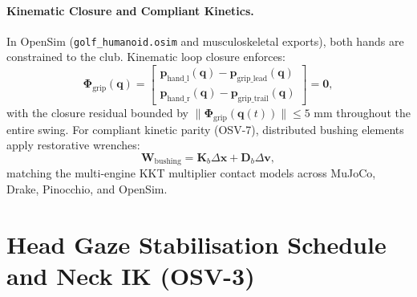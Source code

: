\documentclass[11pt]{article}
\begin{document}
\paragraph{Kinematic Closure and Compliant Kinetics.}
In OpenSim (\texttt{golf\_humanoid.osim} and musculoskeletal exports), both hands are constrained to the club. Kinematic loop closure enforces:
\begin{equation}
  \mathbf{\Phi}_{\mathrm{grip}}(\mathbf{q}) = 
  \begin{bmatrix}
    \mathbf{p}_{\mathrm{hand\_l}}(\mathbf{q}) - \mathbf{p}_{\mathrm{grip\_lead}}(\mathbf{q}) \\
    \mathbf{p}_{\mathrm{hand\_r}}(\mathbf{q}) - \mathbf{p}_{\mathrm{grip\_trail}}(\mathbf{q})
  \end{bmatrix} = \mathbf{0},
\end{equation}
with the closure residual bounded by $\|\mathbf{\Phi}_{\mathrm{grip}}(\mathbf{q}(t))\| \le 5\text{ mm}$ throughout the entire swing. For compliant kinetic parity (OSV-7), distributed bushing elements apply restorative wrenches:
\begin{equation}
  \mathbf{W}_{\mathrm{bushing}} = \mathbf{K}_b \Delta \mathbf{x} + \mathbf{D}_b \Delta \mathbf{v},
\end{equation}
matching the multi-engine KKT multiplier contact models across MuJoCo, Drake, Pinocchio, and OpenSim.

\section{Head Gaze Stabilisation Schedule and Neck IK (OSV-3)}
\label{sec:gaze}
\end{document}
